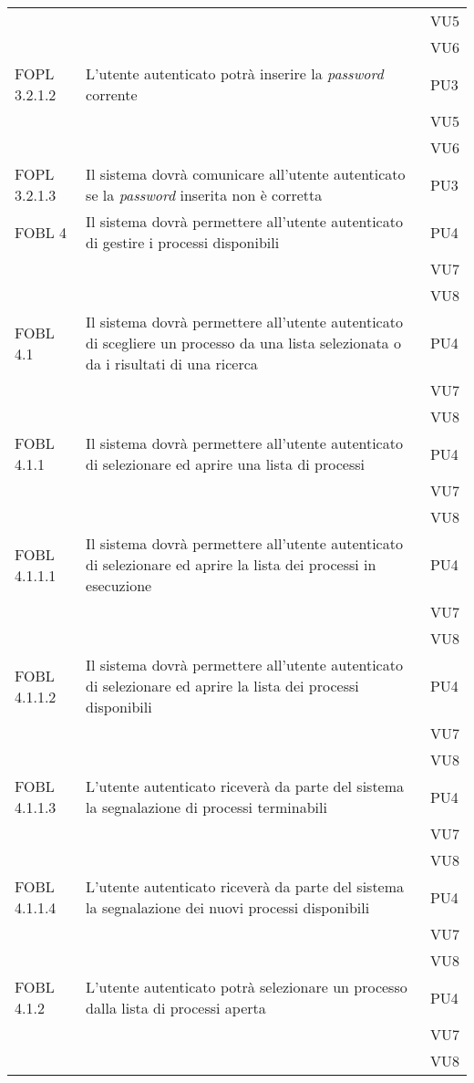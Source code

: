 \begin{longtable}{lXp{}}
&&VU5\\ 
&&VU6\\ 
\midrule 
FOPL 3.2.1.2&L'utente autenticato potrà inserire la \textit{password} corrente&PU3\\ 
&&VU5\\ 
&&VU6\\ 
\midrule 
FOPL 3.2.1.3&Il sistema dovrà comunicare all'utente autenticato se la \textit{password} inserita non è corretta&PU3\\ 
\midrule 
FOBL 4&Il sistema dovrà permettere all'utente autenticato di gestire i processi disponibili&PU4\\ 
&&VU7\\ 
&&VU8\\
\midrule
FOBL 4.1&Il sistema dovrà permettere all'utente autenticato di scegliere un processo da una lista selezionata o da i risultati di una ricerca&PU4\\ 
&&VU7\\ 
&&VU8\\ 
\midrule 
FOBL 4.1.1&Il sistema dovrà permettere all'utente autenticato di selezionare ed aprire una lista di processi&PU4\\ 
&&VU7\\ 
&&VU8\\ 
\midrule 
FOBL 4.1.1.1&Il sistema dovrà permettere all'utente autenticato di selezionare ed aprire la lista dei processi in esecuzione&PU4\\ 
&&VU7\\ 
&&VU8\\ 
\midrule 
FOBL 4.1.1.2&Il sistema dovrà permettere all'utente autenticato di selezionare ed aprire la lista dei processi disponibili&PU4\\ 
&&VU7\\ 
&&VU8\\ 
\midrule 
FOBL 4.1.1.3&L'utente autenticato riceverà da parte del sistema la segnalazione di processi terminabili&PU4\\ 
&&VU7\\ 
&&VU8\\ 
\midrule 
FOBL 4.1.1.4&L'utente autenticato riceverà da parte del sistema la segnalazione dei nuovi processi disponibili&PU4\\ 
&&VU7\\ 
&&VU8\\ 
\midrule 
FOBL 4.1.2&L'utente autenticato potrà selezionare un processo dalla lista di processi aperta&PU4\\ 
&&VU7\\ 
&&VU8\\ 

\end{longtable}
